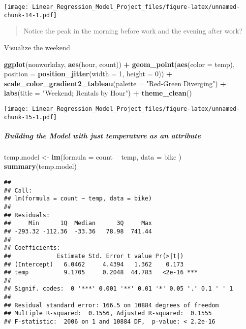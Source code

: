 \documentclass[]{article}
\newenvironment{Shaded}{\begin{snugshade}}{\end{snugshade}}
\newcommand{\KeywordTok}[1]{\textcolor[rgb]{0.13,0.29,0.53}{\textbf{#1}}}
\newcommand{\DataTypeTok}[1]{\textcolor[rgb]{0.13,0.29,0.53}{#1}}
\newcommand{\DecValTok}[1]{\textcolor[rgb]{0.00,0.00,0.81}{#1}}
\newcommand{\StringTok}[1]{\textcolor[rgb]{0.31,0.60,0.02}{#1}}
\newcommand{\OperatorTok}[1]{\textcolor[rgb]{0.81,0.36,0.00}{\textbf{#1}}}
\newcommand{\NormalTok}[1]{#1}
\let\oldsubparagraph\subparagraph
\renewcommand{\subparagraph}[1]{\oldsubparagraph{#1}\mbox{}}
\begin{document}
\texttt{[image: Linear\_Regression\_Model\_Project\_files/figure-latex/unnamed-chunk-14-1.pdf]}

\begin{quote}
Notice the peak in the morning before work and the evening after work?
\end{quote}

Visualize the weekend

\begin{Shaded}
\begin{Highlighting}[]
\KeywordTok{ggplot}\NormalTok{(nonworkday, }\KeywordTok{aes}\NormalTok{(hour, count)) }\OperatorTok{+}
\StringTok{    }\KeywordTok{geom_point}\NormalTok{(}\KeywordTok{aes}\NormalTok{(}\DataTypeTok{color =}\NormalTok{ temp), }\DataTypeTok{position =} \KeywordTok{position_jitter}\NormalTok{(}\DataTypeTok{width =} \DecValTok{1}\NormalTok{, }\DataTypeTok{height =} \DecValTok{0}\NormalTok{)) }\OperatorTok{+}
\StringTok{    }\KeywordTok{scale_color_gradient2_tableau}\NormalTok{(}\DataTypeTok{palette =} \StringTok{"Red-Green Diverging"}\NormalTok{) }\OperatorTok{+}
\StringTok{    }\KeywordTok{labs}\NormalTok{(}\DataTypeTok{title =} \StringTok{"Weekend; Rentals by Hour"}\NormalTok{) }\OperatorTok{+}
\StringTok{    }\KeywordTok{theme_clean}\NormalTok{()}
\end{Highlighting}
\end{Shaded}

\texttt{[image: Linear\_Regression\_Model\_Project\_files/figure-latex/unnamed-chunk-15-1.pdf]}

\subparagraph{Building the Model with just temperature as an
attribute}\label{building-the-model-with-just-temperature-as-an-attribute}

\begin{Shaded}
\begin{Highlighting}[]
\NormalTok{temp.model <-}\StringTok{ }\KeywordTok{lm}\NormalTok{(}\DataTypeTok{formula =}\NormalTok{ count }\OperatorTok{~}\StringTok{ }\NormalTok{temp, }\DataTypeTok{data =}\NormalTok{ bike )}
\KeywordTok{summary}\NormalTok{(temp.model)}
\end{Highlighting}
\end{Shaded}

\begin{verbatim}
## 
## Call:
## lm(formula = count ~ temp, data = bike)
## 
## Residuals:
##     Min      1Q  Median      3Q     Max 
## -293.32 -112.36  -33.36   78.98  741.44 
## 
## Coefficients:
##             Estimate Std. Error t value Pr(>|t|)    
## (Intercept)   6.0462     4.4394   1.362    0.173    
## temp          9.1705     0.2048  44.783   <2e-16 ***
## ---
## Signif. codes:  0 '***' 0.001 '**' 0.01 '*' 0.05 '.' 0.1 ' ' 1
## 
## Residual standard error: 166.5 on 10884 degrees of freedom
## Multiple R-squared:  0.1556, Adjusted R-squared:  0.1555 
## F-statistic:  2006 on 1 and 10884 DF,  p-value: < 2.2e-16
\end{verbatim}
\end{document}
